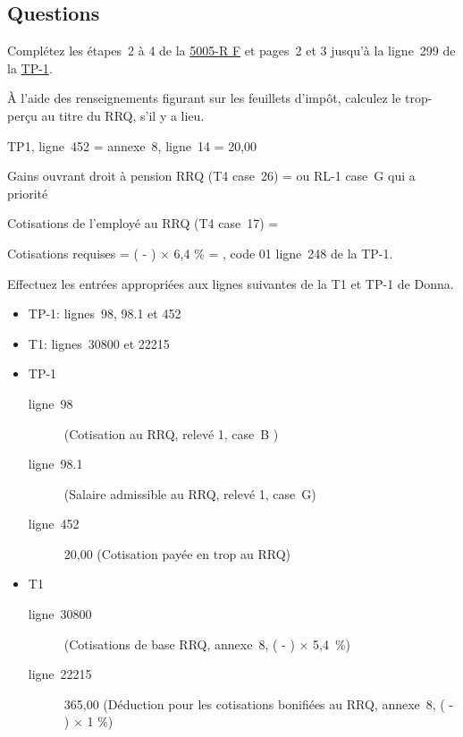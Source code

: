 \subsection{Questions}
Complétez les étapes~2 à 4 de la \href{https://www.canada.ca/fr/agence-revenu/services/formulaires-publications/trousses-impot-toutes-annees-imposition/trousse-generale-impot-prestations/quebec/5005-r.html}{5005-R F} et pages~2 et 3 jusqu'à la ligne~299 de la \href{https://www.revenuquebec.ca/documents/fr/formulaires/tp/2023-12/TP-1.D%282023-12%29.pdf}{TP-1}.

\setcounter{question}{0}
\begin{question}
	À l'aide des renseignements figurant sur les feuillets d'impôt, calculez le trop-perçu au titre du RRQ, s'il y a lieu.
\end{question}
TP1, ligne~452 = annexe~8, ligne~14 = 20,00

Gains ouvrant droit à pension RRQ (T4 case~26) =  ou RL-1 case~G qui a priorité

Cotisations de l’employé au RRQ (T4 case~17) = 

Cotisations requises = ( - ) $\times$ 6,4 \% = , code 01 ligne~248 de la TP-1.

\begin{question}
	Effectuez les entrées appropriées aux lignes suivantes de la T1 et TP-1 de Donna.
	\begin{itemize}
		\item TP-1: lignes~98, 98.1 et 452 
		\item T1: lignes~30800 et 22215
	\end{itemize}
\end{question}
\begin{itemize}
	\item TP-1
	\begin{description}
		\item[ligne~98]  (Cotisation au RRQ, relevé 1, case~B )
		\item[ligne~98.1]  (Salaire admissible au RRQ, relevé 1, case~G)
		\item[ligne~452] 20,00 (Cotisation payée en trop au RRQ)
	\end{description}
	\item T1
	\begin{description}
		\item[ligne~30800]  (Cotisations de base RRQ, annexe~8, ( -  ) $\times$ 5,4~\%)
		\item[ligne~22215] 365,00 (Déduction pour les cotisations bonifiées au RRQ, annexe~8, ( -  ) $\times$ 1 \%)
	\end{description}
\end{itemize}

